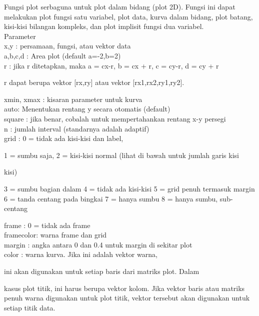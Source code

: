 \documentclass[a4paper,10pt]{article}
\begin{document}
\begin{eulernotebook}
\begin{eulercomment}
\begin{eulercomment}
\begin{eulercomment}
Fungsi plot serbaguna untuk plot dalam bidang (plot 2D). Fungsi ini
dapat melakukan plot fungsi satu variabel, plot data, kurva dalam
bidang, plot batang, kisi-kisi bilangan kompleks, dan plot implisit
fungsi dua variabel.\\
Parameter\\
x,y : persamaan, fungsi, atau vektor data\\
a,b,c,d : Area plot (default a=-2,b=2)\\
r : jika r ditetapkan, maka a = cx-r, b = cx + r, c = cy-r, d = cy + r\\
\end{eulercomment}
\begin{eulerttcomment}
    r dapat berupa vektor [rx,ry] atau vektor [rx1,rx2,ry1,ry2].
\end{eulerttcomment}
\begin{eulercomment}
xmin, xmax : kisaran parameter untuk kurva\\
auto: Menentukan rentang y secara otomatis (default)\\
square : jika benar, cobalah untuk mempertahankan rentang x-y persegi\\
n : jumlah interval (standarnya adalah adaptif)\\
grid : 0 = tidak ada kisi-kisi dan label,\\
\end{eulercomment}
\begin{eulerttcomment}
       1 = sumbu saja,
       2 = kisi-kisi normal (lihat di bawah untuk jumlah garis kisi
\end{eulerttcomment}
\begin{eulercomment}
kisi)\\
\end{eulercomment}
\begin{eulerttcomment}
       3 = sumbu bagian dalam
       4 = tidak ada kisi-kisi
       5 = grid penuh termasuk margin
       6 = tanda centang pada bingkai
       7 = hanya sumbu
       8 = hanya sumbu, sub-centang
\end{eulerttcomment}
\begin{eulercomment}
frame : 0 = tidak ada frame\\
framecolor: warna frame dan grid\\
margin : angka antara 0 dan 0.4 untuk margin di sekitar plot\\
color : warna kurva. Jika ini adalah vektor warna,\\
\end{eulercomment}
\begin{eulerttcomment}
       ini akan digunakan untuk setiap baris dari matriks plot. Dalam
\end{eulerttcomment}
\begin{eulercomment}
kasus plot titik, ini harus berupa vektor kolom. Jika vektor baris
atau matriks penuh warna digunakan untuk plot titik, vektor tersebut
akan digunakan untuk setiap titik data.


\end{eulercomment}
\end{eulercomment}
\end{eulercomment}
\end{eulernotebook}
\end{document}
